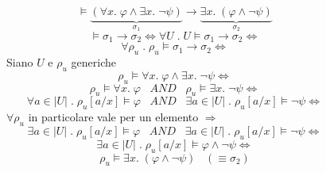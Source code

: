 \documentclass{article}
\theoremstyle{break}
\theoremstyle{break}
\theoremstyle{break}
\theoremstyle{break}
\begin{document}
  \begin{figure}[H]
    \begin{exercise}
      \[
        \models \underbrace{(\forall x.\; \varphi \wedge \exists x.\; \neg \psi )}_{\sigma_1} \to \underbrace{\exists x.\; (\varphi \wedge \neg \psi )}_{\sigma_2}
      \] 
      \[
        \models \sigma_1 \to \sigma_2 \Leftrightarrow \forall U \;.\; U \models \sigma_1 \to \sigma_2 \Leftrightarrow
      \] 
      \[
        \forall \rho_u \;.\; \rho_u \models \sigma_1 \to \sigma_2 \Leftrightarrow
      \] 
      Siano \( U \) e \( \rho_u \) generiche
      \[
        \rho_u \models \forall x.\; \varphi \wedge \exists x.\; \neg \psi \Leftrightarrow
      \] 
      \[
        \rho_u \models \forall x.\; \varphi  \;\;\;AND\;\;\; \rho_u \models \exists x.\; \neg \psi \Leftrightarrow
      \] 
      \[
        \forall a \in |U| \;.\; \rho_u[a/x] \models \varphi \;\;\;AND\;\;\; \exists a \in |U| \;.\; \rho_u[a/x] \models \neg \psi \Leftrightarrow
      \] 
      \( \forall \rho_u \) in particolare vale per un elemento \( \Rightarrow \) 
      \[
        \exists a \in |U| \;.\; \rho_u[a/x] \models \varphi \;\;\;AND\;\;\; \exists a \in |U| \;.\; \rho_u[a/x] \models \neg \psi \Leftrightarrow
      \] 
      \[
        \exists a \in |U| \;.\; \rho_u[a/x] \models \varphi \wedge \neg \psi \Leftrightarrow
      \] 
      \[
        \rho_u \models \exists x.\; (\varphi \wedge \neg \psi ) \;\;\; (\equiv \sigma_2)
      \] 
    \end{exercise}
  \end{figure}
\end{document}
